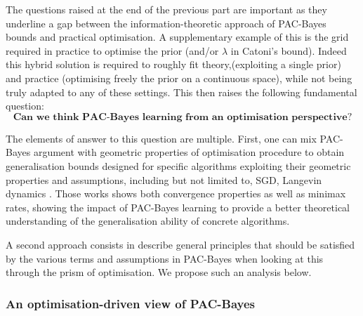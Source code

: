 The questions raised at the end of the previous part are important as they underline a gap between the information-theoretic approach of PAC-Bayes bounds and practical optimisation. A supplementary example of this is the grid required in practice to optimise the prior (and/or $\lambda$ in Catoni's bound). Indeed this hybrid solution is required to roughly fit theory,(exploiting a single prior) and practice (optimising freely the prior on a continuous space), while not being truly adapted to any of these settings. This then raises the following fundamental question:
\[ \textbf{Can we think PAC-Bayes learning from an optimisation perspective?} \]

The elements of answer to this question are multiple. First, one can mix PAC-Bayes argument with geometric properties of optimisation procedure to obtain generalisation bounds designed for specific algorithms exploiting their geometric properties and assumptions, including but not limited to, SGD, Langevin dynamics  \citep{london2017pac,dziugaite2018entropy,neu2021info,clerico2022generalisation,haghifam2023limit,zhou2023toward}. Those works shows both convergence properties as well as minimax rates, showing the impact of PAC-Bayes learning to provide a better theoretical understanding of the generalisation ability of concrete algorithms. 

A second approach consists in describe general principles that should be satisfied by the various terms and assumptions in PAC-Bayes when looking at this through the prism of optimisation. We propose such an analysis below.

\subsubsection*{An optimisation-driven view of PAC-Bayes}

